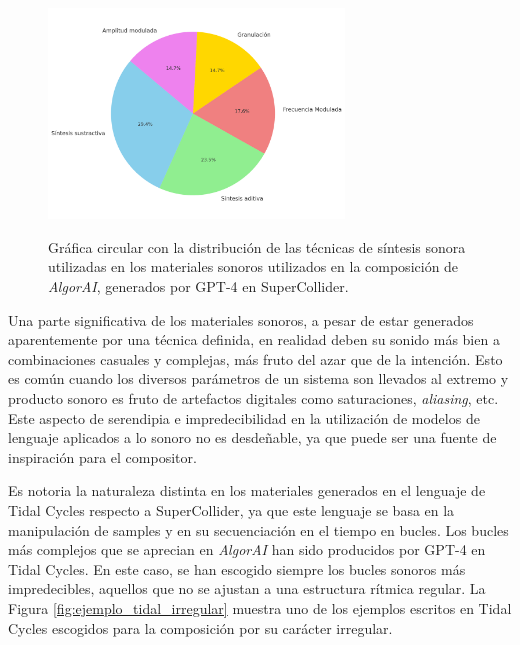 \begin{figure}[H]
    \caption[Gráfica circular con la distribución de las técnicas de síntesis sonora utilizadas en los materiales sonoros generados por GPT-4 en SuperCollider]{Gráfica circular con la distribución de las técnicas de síntesis sonora utilizadas en los materiales sonoros utilizados en la composición de \emph{AlgorAI}, generados por GPT-4 en SuperCollider.}
    \centering
    \includegraphics[width=0.7\textwidth]{./figuras/grafica_sintesis_gpt4_quesitos.png}
    \source{\propio}
    \label{fig:grafica_sintesis_gpt4}
\end{figure}

Una parte significativa de los materiales sonoros, a pesar de estar generados aparentemente por una técnica definida, en realidad deben su sonido más bien a combinaciones casuales y complejas, más fruto del azar que de la intención. Esto es común cuando los diversos parámetros de un sistema son llevados al extremo y producto sonoro es fruto de artefactos digitales como saturaciones, \emph{aliasing}, etc. Este aspecto de serendipia e impredecibilidad en la utilización de modelos de lenguaje aplicados a lo sonoro no es desdeñable, ya que puede ser una fuente de inspiración para el compositor.

Es notoria la naturaleza distinta en los materiales generados en el lenguaje de Tidal Cycles respecto a SuperCollider, ya que este lenguaje se basa en la manipulación de samples y en su secuenciación en el tiempo en bucles. Los bucles más complejos que se aprecian en \emph{AlgorAI} han sido producidos por GPT-4 en Tidal Cycles. En este caso, se han escogido siempre los bucles sonoros más impredecibles, aquellos que no se ajustan a una estructura rítmica regular. La Figura \ref{fig:ejemplo_tidal_irregular} muestra uno de los ejemplos escritos en Tidal Cycles escogidos para la composición por su carácter irregular.



